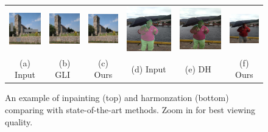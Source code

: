 \begin{figure}[t]
\centering
\setlength\tabcolsep{1pt}
\begin{tabular}{cccccc}
  \includegraphics[width=.16\textwidth]{figures/teaser/000000120572_input_image.jpg}&
  \includegraphics[width=.16\textwidth]{figures/teaser/output_mask17.jpg}&
  \includegraphics[width=.16\textwidth]{figures/teaser/000000120572_synthesized_image.jpg} &
    \includegraphics[width=.16\textwidth]{figures/teaser/input.jpg}&
  \includegraphics[width=.16\textwidth]{figures/teaser/dh.jpg}&
  \includegraphics[width=.16\textwidth]{figures/teaser/ours.jpg} \\
  (a) Input  & (b) GLI~\cite{iizuka2017globally} & (c) Ours & (d) Input  & (e) DH~\cite{tsai2017deep} & (f) Ours  \\
\end{tabular}
\caption{An example of inpainting (top) and harmonzation (bottom) comparing with state-of-the-art methods. Zoom in for best viewing quality.}
\label{fig:teaser}
\vspace{-15pt}
\end{figure}

